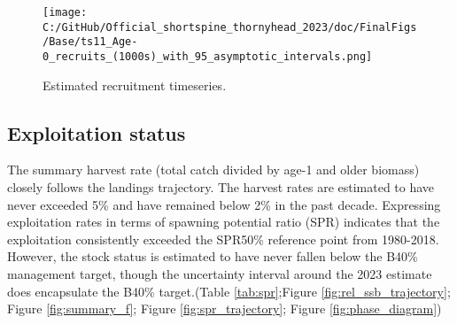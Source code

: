 \documentclass[11pt,
  english,
  letterpaper,
]{article}
\begin{document}
\begin{figure}
\centering
\texttt{[image: C:/GitHub/Official\_shortspine\_thornyhead\_2023/doc/FinalFigs/Base/ts11\_Age-0\_recruits\_(1000s)\_with\_95\_asymptotic\_intervals.png]}
\caption{Estimated recruitment timeseries.\label{fig:rec_trajectory}}
\end{figure}

\hypertarget{exploitation-status}{%
\subsection*{Exploitation status}\label{exploitation-status}}

The summary harvest rate (total catch divided by age-1 and older biomass) closely follows the landings trajectory. The harvest rates are estimated to have never exceeded 5\% and have remained below 2\% in the past decade. Expressing exploitation rates in terms of spawning potential ratio (SPR) indicates that the exploitation consistently exceeded the SPR50\% reference point from 1980-2018. However, the stock status is estimated to have never fallen below the B40\% management target, though the uncertainty interval around the 2023 estimate does encapsulate the B40\% target.(Table \ref{tab:spr};Figure \ref{fig:rel_ssb_trajectory}; Figure \ref{fig:summary_f}; Figure \ref{fig:spr_trajectory}; Figure \ref{fig:phase_diagram})

\begingroup\fontsize{10}{12}\selectfont
\begingroup\fontsize{10}{12}\selectfont
\end{document}
